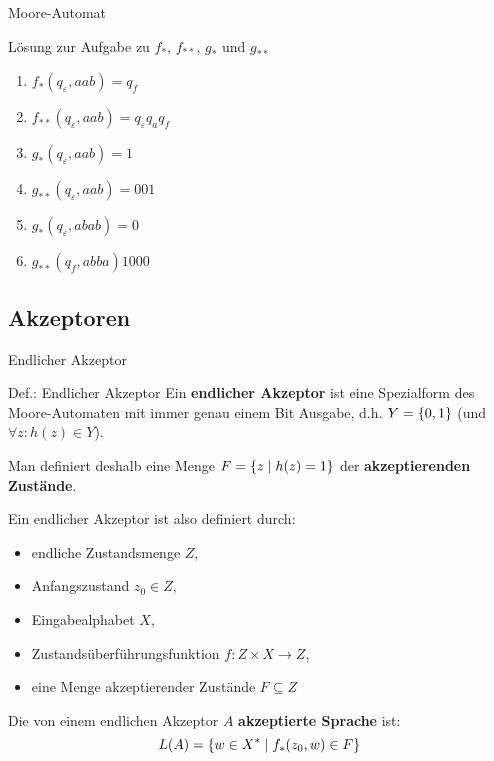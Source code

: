 \begin{frame}{Moore-Automat}
	\begin{block}{Lösung zur Aufgabe zu $f_{\ast}$, $f_{\ast\ast}$, $g_{\ast}$ und $g_{\ast\ast}$}
		\begin{enumerate}
					\item $f_{\ast}(q_{\varepsilon}, aab) = q_{f}$
					\item $f_{\ast\ast}(q_{\varepsilon}, aab) = q_{\varepsilon}q_{a}q_{f}$

					\item $g_{\ast}(q_{\varepsilon}, aab) = 1$
					\item $g_{\ast\ast}(q_{\varepsilon}, aab) = 001$
					\item $g_{\ast}(q_{\varepsilon}, abab) = 0$
					\item $g_{\ast\ast}(q_{f}, abba) 1000$
			\end{enumerate}
	\end{block}
\end{frame}

\subsection{Akzeptoren}
\begin{frame}{Endlicher Akzeptor}
	\begin{block}{Def.: Endlicher Akzeptor}
		Ein \textbf{endlicher Akzeptor} ist eine Spezialform des Moore-Automaten mit immer genau einem Bit Ausgabe, d.h. $Y = \left\{ 0,1 \right\}$ (und $\forall z : h(z) \in Y$).

		Man definiert deshalb eine Menge $F = \left\{ z \mid h(z)=1 \right\}$ der \textbf{akzeptierenden Zustände}.

		Ein endlicher Akzeptor ist also definiert durch:

		\begin{itemize}
			\item endliche Zustandsmenge $Z$,
			\item Anfangszustand $z_0 \in Z$,
			\item Eingabealphabet $X$,
			\item Zustandsüberführungsfunktion $f: Z \times X \rightarrow Z$,
			\item eine Menge akzeptierender Zustände $F \subseteq Z$
		\end{itemize}
		Die von einem endlichen Akzeptor $A$ \textbf{akzeptierte Sprache} ist:
		\[
			L(A) = \left\{ w \in X^{\ast} \mid f_{\ast}(z_{0},w) \in F \right\}
		\]
	\end{block}
\end{frame}

